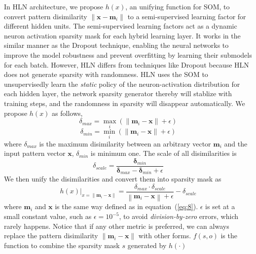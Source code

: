\documentclass[3p,times,procedia]{elsarticle}
\begin{document}
In HLN architecture,
we propose $h(x)$, 
an unifying function for 
SOM, to convert pattern disimilarity
$\|\mathbf{x}-\mathbf{m}_i\|$ to
a semi-supervised learning factor for
different hidden units. 
The semi-supervised
learning factors act as a 
dynamic neuron activation 
sparsity mask for 
each hybrid learning layer.
It works in the similar manner  
as the Dropout 
technique\cite{srivastava2014dropout}, 
enabling the neural networks 
to improve the model robustness 
and prevent
overfitting by learning 
their submodels for 
each batch. However, HLN differs from 
techniques like Dropout because 
HLN does not generate sparsity with 
randomness. HLN uses the SOM
to unsupervisedly learn 
the \emph{static}
policy of the neuron-activation 
distribution for
each hidden layer, the network 
sparsity generator thereby
will stablize with training 
steps, and the
randomness in sparsity will 
disappear automatically.
We propose $h(x)$ as follows,
\begin{equation}
	\delta_{max} = \max_i\left(
	\|\mathbf{m}_i-\mathbf{x}\|+\epsilon
	\right)
	\label{eq:10}
\end{equation}
\begin{equation}
	\delta_{min} = \min_i\left(
	\|\mathbf{m}_i-\mathbf{x}\|+\epsilon
	\right)
	\label{eq:11}
\end{equation}
where $\delta_{max}$ is the maximum 
disimilarity
between an arbitrary vector 
$\mathbf{m}_i$
and the input pattern vector $\mathbf{x}$,
$\delta_{min}$ is minimum one.
The scale of all disimilarities is
\begin{equation}
	\delta_{scale} = 
	\frac{\mathbf{\delta}_{min}}
	{\mathbf{\delta}_{max}-
	\mathbf{\delta}_{min} + \epsilon}
	\label{eq:12}
\end{equation}
We then unify the disimilarities 
and convert them into sparsity 
mask as
\begin{equation}
	h(x)|_{x=\|\mathbf{m}_i-\mathbf{x}\|}=
	\frac{\delta_{max}\cdot\delta_{scale}}
	{\left\|\mathbf{m}_i-\mathbf{x}\right\|
	+\epsilon}-\delta_{scale}
	\label{eq:13}
\end{equation}
where $\mathbf{m}_i$ and $\mathbf{x}$ 
is the same way defined as in 
equation~(\ref{eq:8}).
$\epsilon$ is set at a small constant
value, such as $\epsilon=10^{-5}$,
to avoid 
\emph{division-by-zero} errors,
which rarely happens. 
Notice that
if any other metric is preferred, 
we can
always replace the pattern 
disimilarity
$\|\mathbf{m}_i-\mathbf{x}\|$ with 
other forms.
$f(s,o)$ is the function to combine the 
sparsity mask $s$ generated by $h(\cdot)$ 
\end{document}
